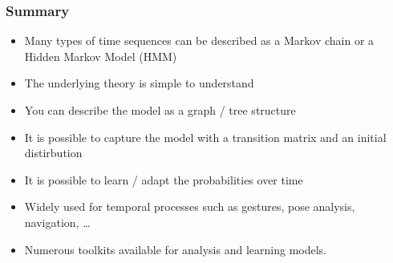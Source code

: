 \documentclass[10pt]{beamer}
\begin{document}
\begin{frame}
  \frametitle{Summary}
  \begin{itemize}
  \item Many types of time sequences can be described as a Markov chain or a Hidden Markov Model (HMM)
  \item The underlying theory is simple to understand
  \item You can describe the model as a graph / tree structure
  \item It is possible to capture the model with a transition matrix and an initial distirbution
  \item It is possible to learn / adapt the probabilities over time
  \item Widely used for temporal processes such as gestures, pose analysis, navigation, \ldots
  \item Numerous toolkits available for analysis and learning models.
  \end{itemize}
\end{frame}
\end{document}
